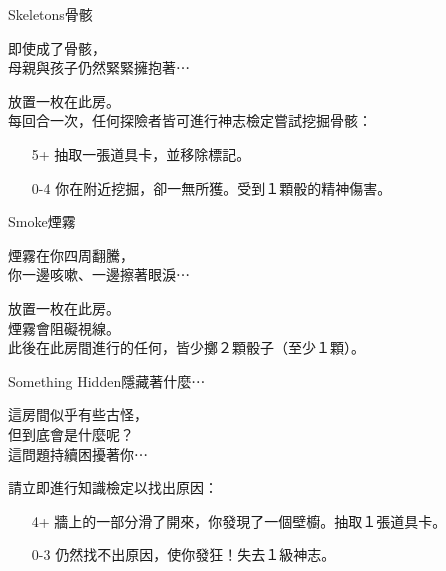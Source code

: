 %
\begin{EventCard}{Skeletons}{骨骸}

  \begin{CardStory}
    即使成了骨骸，\\
    母親與孩子仍然緊緊擁抱著⋯
  \end{CardStory}

  放置一枚在此房。\\[0.5em]
  每回合一次，任何探險者皆可進行神志檢定嘗試挖掘骨骸：
  \begin{itemize}
    \item[5+] 抽取一張道具卡，並移除標記。
    \item[0-4] 你在附近挖掘，卻一無所獲。受到１顆骰的精神傷害。
  \end{itemize}

\end{EventCard}%
%
\begin{EventCard}{Smoke}{煙霧}

  \begin{CardStory}
    煙霧在你四周翻騰，\\
    你一邊咳嗽、一邊擦著眼淚⋯
  \end{CardStory}

  放置一枚在此房。\\[0.5em]
  煙霧會阻礙視線。\\[0.5em]
  此後在此房間進行的任何，皆少擲２顆骰子（至少１顆）。\\[0.5em]

\end{EventCard}%
%
\begin{EventCard}{Something Hidden}{隱藏著什麼⋯}

  \begin{CardStory}
    這房間似乎有些古怪，\\
    但到底會是什麼呢？\\
    這問題持續困擾著你⋯
  \end{CardStory}

  請立即進行知識檢定以找出原因：
  \begin{itemize}
    \item[4+] 牆上的一部分滑了開來，你發現了一個壁櫥。抽取１張道具卡。
    \item[0-3] 仍然找不出原因，使你發狂！失去１級神志。
  \end{itemize}

\end{EventCard}%
%
